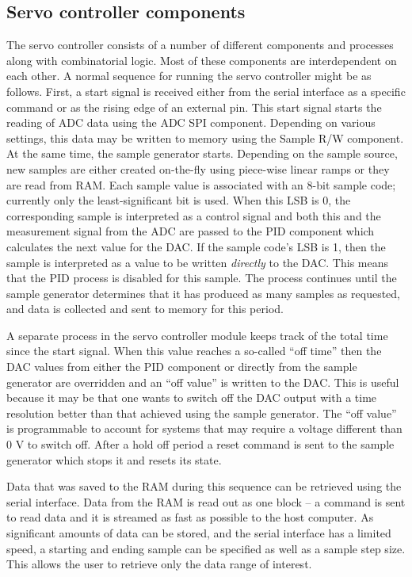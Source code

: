 \documentclass{article}
\begin{document}
\subsection{Servo controller components}
\label{ssec:servoControllerComponents}
The servo controller consists of a number of different components and processes along with combinatorial logic.  Most of these components are interdependent on each other.  A normal sequence for running the servo controller might be as follows.  First, a start signal is received either from the serial interface as a specific command or as the rising edge of an external pin.  This start signal starts the reading of ADC data using the ADC SPI component.  Depending on various settings, this data may be written to memory using the Sample R/W component.  At the same time, the sample generator starts.  Depending on the sample source, new samples are either created on-the-fly using piece-wise linear ramps or they are read from RAM.  Each sample value is associated with an 8-bit sample code; currently only the least-significant bit is used.  When this LSB is 0, the corresponding sample is interpreted as a control signal and both this and the measurement signal from the ADC are passed to the PID component which calculates the next value for the DAC.  If the sample code's LSB is 1, then the sample is interpreted as a value to be written \emph{directly} to the DAC.  This means that the PID process is disabled for this sample.  The process continues until the sample generator determines that it has produced as many samples as requested, and data is collected and sent to memory for this period.

A separate process in the servo controller module keeps track of the total time since the start signal.  When this value reaches a so-called ``off time'' then the DAC values from either the PID component or directly from the sample generator are overridden and an ``off value'' is written to the DAC.  This is useful because it may be that one wants to switch off the DAC output with a time resolution better than that achieved using the sample generator.  The ``off value'' is programmable to account for systems that may require a voltage different than 0 V to switch off.  After a hold off period a reset command is sent to the sample generator which stops it and resets its state.

Data that was saved to the RAM during this sequence can be retrieved using the serial interface.  Data from the RAM is read out as one block -- a command is sent to read data and it is streamed as fast as possible to the host computer.  As significant amounts of data can be stored, and the serial interface has a limited speed, a starting and ending sample can be specified as well as a sample step size.  This allows the user to retrieve only the data range of interest.
\end{document}
